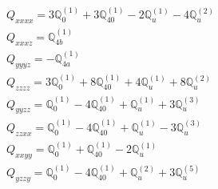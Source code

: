 \documentclass[fleqn,8pt,landscape]{jsarticle}
\begin{document}
\begin{align*}
& Q_{xxxx} = 3 \mathbb{Q}_{0}^{(1)} + 3 \mathbb{Q}_{40}^{(1)} - 2 \mathbb{Q}_{u}^{(1)} - 4 \mathbb{Q}_{u}^{(2)} \\
& Q_{xxxz} = \mathbb{Q}_{4b}^{(1)} \\
& Q_{yyyz} = - \mathbb{Q}_{4a}^{(1)} \\
& Q_{zzzz} = 3 \mathbb{Q}_{0}^{(1)} + 8 \mathbb{Q}_{40}^{(1)} + 4 \mathbb{Q}_{u}^{(1)} + 8 \mathbb{Q}_{u}^{(2)} \\
& Q_{yyzz} = \mathbb{Q}_{0}^{(1)} - 4 \mathbb{Q}_{40}^{(1)} + \mathbb{Q}_{u}^{(1)} + 3 \mathbb{Q}_{u}^{(3)} \\
& Q_{zzxx} = \mathbb{Q}_{0}^{(1)} - 4 \mathbb{Q}_{40}^{(1)} + \mathbb{Q}_{u}^{(1)} - 3 \mathbb{Q}_{u}^{(3)} \\
& Q_{xxyy} = \mathbb{Q}_{0}^{(1)} + \mathbb{Q}_{40}^{(1)} - 2 \mathbb{Q}_{u}^{(1)} \\
& Q_{yzzy} = \mathbb{Q}_{0}^{(1)} - 4 \mathbb{Q}_{40}^{(1)} + \mathbb{Q}_{u}^{(2)} + 3 \mathbb{Q}_{u}^{(5)}
\end{align*}
\end{document}
